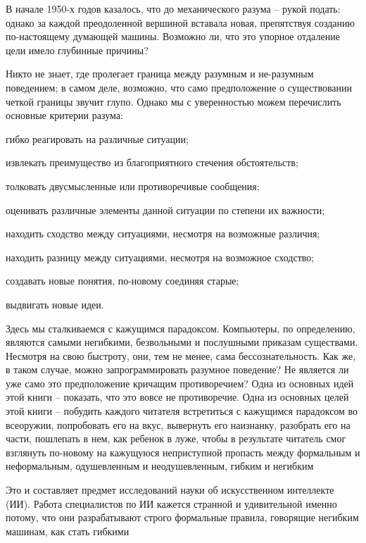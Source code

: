 \documentclass[../main.tex]{subfiles}
\begin{document}
В начале 1950-х годов казалось, что до механического разума \--- рукой подать: однако за каждой преодоленной вершиной вставала новая, препятствуя созданию по-настоящему думающей машины. Возможно ли, что это упорное отдаление цели имело глубинные причины?

Никто не знает, где пролегает граница между разумным и не-разумным поведением; в самом деле, возможно, что само предположение о существовании четкой границы звучит глупо. Однако мы с уверенностью можем перечислить основные критерии разума:

гибко реагировать на различные ситуации;

извлекать преимущество из благоприятного стечения обстоятельств;

толковать двусмысленные или противоречивые сообщения;

оценивать различные элементы данной ситуации по степени их важности;

находить сходство между ситуациями, несмотря на возможные различия;

находить разницу между ситуациями, несмотря на возможное сходство;

создавать новые понятия, по-новому соединяя старые;

выдвигать новые идеи.

Здесь мы сталкиваемся с кажущимся парадоксом. Компьютеры, по определению, являются самыми негибкими, безвольными и послушными приказам существами. Несмотря на свою быстроту, они, тем не менее, сама бессознательность. Как же, в таком случае, можно запрограммировать разумное поведение? Не является ли уже само это предположение кричащим противоречием? Одна из основных идей этой книги \--- показать, что это вовсе не противоречие. Одна из основных целей этой книги \--- побудить каждого читателя встретиться с кажущимся парадоксом во всеоружии, попробовать его на вкус, вывернуть его наизнанку, разобрать его на части, пошлепать в нем, как ребенок в луже, чтобы в результате читатель смог взглянуть по-новому на кажущуюся неприступной пропасть между формальным и неформальным, одушевленным и неодушевленным, гибким и негибким

Это и составляет предмет исследований науки об искусственном интеллекте (ИИ). Работа специалистов по ИИ кажется странной и удивительной именно потому, что они разрабатывают строго формальные правила, говорящие негибким машинам, как стать гибкими
\end{document}
